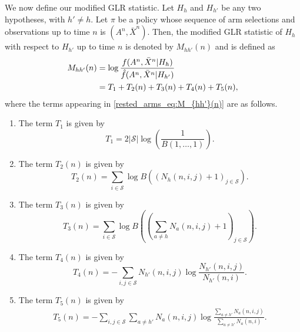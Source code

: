 We now define our modified GLR statistic. Let $H_h$ and $H_{h'}$ be any two hypotheses, with $h'\neq h$. Let $\pi$ be a policy whose sequence of arm selections and observations up to time  $n$ is $(A^n,\bar{X}^n)$. Then, the modified GLR statistic of $H_h$ with respect to $H_{h'}$ up to time $n$ is denoted by $M_{hh'}(n)$ and is defined as
\begingroup\allowdisplaybreaks\begin{align}
	M_{hh'}(n)
	&=\log\frac{f(A^n,\bar{X}^n|H_h)}{\hat{f}(A^n,\bar{X}^n|H_{h'})}\nonumber\\
	&=T_1+T_2(n)+T_3(n)+T_4(n)+T_5(n),\label{rested_arms_eq:M_{hh'}(n)}
\end{align}\endgroup
where the terms appearing in \eqref{rested_arms_eq:M_{hh'}(n)} are as follows.
\begin{enumerate}
	\item The term $T_1$ is given by
	\begin{equation}
		T_1=2|\mathcal{S}|\log\left(\frac{1}{B(1,\ldots,1)}\right).\label{rested_arms_eq:t_1}
	\end{equation}
	\item The term $T_2(n)$ is given by
    \begin{equation}
    	T_2(n)=\sum\limits_{i\in\mathcal{S}}\log B((N_h(n,i,j)+1)_{j\in\mathcal{S}}).\label{rested_arms_eq:t_2(n)}
    \end{equation}
	\item The term $T_3(n)$ is given by
	\begin{equation}
		T_3(n)=\sum\limits_{i\in\mathcal{S}}\log B\left(\left(\sum\limits_{a\neq h}N_a(n,i,j)+1\right)_{j\in\mathcal{S}}\right).\label{rested_arms_eq:t_3(n)}
	\end{equation}
	\item The term $T_4(n)$ is given by
	\begin{equation}
		T_4(n)=-\sum\limits_{i,j\in\mathcal{S}}N_{h'}(n,i,j)\log\frac{N_{h'}(n,i,j)}{N_{h'}(n,i)}.\label{rested_arms_eq:t_4(n)}
	\end{equation}
	\item The term $T_5(n)$ is given by
	\begingroup\allowdisplaybreaks\begin{align}
		T_5(n)=-\sum\limits_{i,j\in\mathcal{S}}\sum\limits_{a\neq h'}N_{a}(n,i,j)\log\frac{\sum\limits_{a\neq h'}N_{a}(n,i,j)}{\sum\limits_{a\neq h'}N_{a}(n,i)}.\label{rested_arms_eq:t_5(n)}
	\end{align}\endgroup
\end{enumerate}

